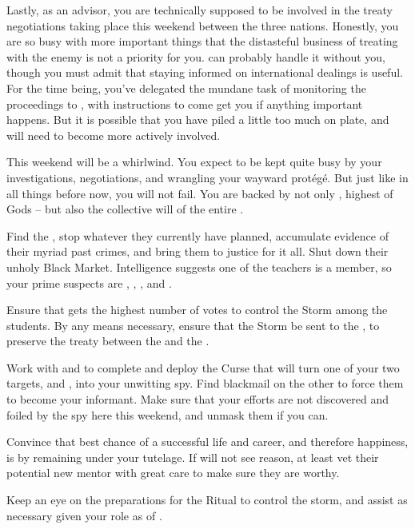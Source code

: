 \documentclass[char]{GL2020}
\begin{document}
Lastly, as an advisor, you are technically supposed to be involved in the treaty negotiations taking place this weekend between the three nations. Honestly, you are so busy with more important things that the distasteful business of treating with the enemy is not a priority for you. \cDiplomat{} can probably handle it without you, though you must admit that staying informed on international dealings is useful. For the time being, you've delegated the mundane task of monitoring the proceedings to \cScholarship{}, with instructions to come get you if anything important happens. But it is possible that you have piled a little too much on  plate, and will need to become more actively involved.

This weekend will be a whirlwind. You expect to be kept quite busy by your investigations, negotiations, and wrangling your wayward protégé. But just like in all things before now, you will not fail. You are backed by not only \cTechGod{}, highest of Gods -- but also the collective will of the entire \pTech{}.

\begin{itemz}
	\item Find the \pGoaties{}, stop whatever they currently have planned, accumulate evidence of their myriad past crimes, and bring them to justice for it all. Shut down their unholy Black Market. Intelligence suggests one of the \pTech{} teachers is a member, so your prime suspects are \cEthics{\full}, \cBeetle{\full}, \cLibrarian{\full}, and \cChupInventor{\full}.
	\item Ensure that \cScholarship{} gets the highest number of votes to control the Storm among the \pTech{} students. By any means necessary, ensure that the Storm be sent to the \pShip{}, to preserve the treaty between the \pFarm{} and the \pTech{}.
	\item Work with \cScholarship{} and \cPrince{} to complete and deploy the Curse that will turn one of your two \pShip{} targets, \cInitiate{} and \cPirate{}, into your unwitting spy. Find blackmail on the other to force them to become your informant. Make sure that your efforts are not discovered and foiled by the \pShip{} spy here this weekend, and unmask them if you can.
	\item Convince \cScholarship{} that \cScholarship{\their} best chance of a successful life and career, and therefore happiness, is by remaining under your tutelage. If \cScholarship{\they} will not see reason, at least vet their potential new mentor with great care to make sure they are worthy.
	\item Keep an eye on the preparations for the Ritual to control the storm, and assist as necessary given your role as \cAntiChup{\cleric} of \cTechGod{}. 
\end{itemz}
\end{document}
